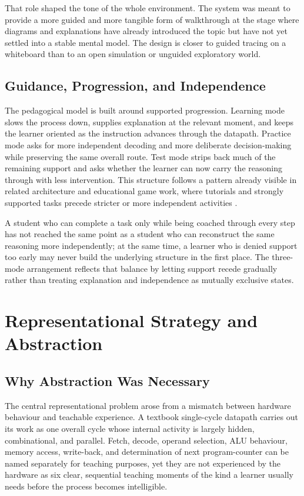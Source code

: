 That role shaped the tone of the whole environment. The system was meant to provide a more guided and more tangible form of walkthrough at the stage where diagrams and explanations have already introduced the topic but have not yet settled into a stable mental model. The design is closer to guided tracing on a whiteboard than to an open simulation or unguided exploratory world.

\subsection{Guidance, Progression, and Independence}

The pedagogical model is built around supported progression. Learning mode slows the process down, supplies explanation at the relevant moment, and keeps the learner oriented as the instruction advances through the datapath. Practice mode asks for more independent decoding and more deliberate decision-making while preserving the same overall route. Test mode strips back much of the remaining support and asks whether the learner can now carry the reasoning through with less intervention. This structure follows a pattern already visible in related architecture and educational game work, where tutorials and strongly supported tasks precede stricter or more independent activities \cite{tlili2016improving,tan2023vr}.

A student who can complete a task only while being coached through every step has not reached the same point as a student who can reconstruct the same reasoning more independently; at the same time, a learner who is denied support too early may never build the underlying structure in the first place. The three-mode arrangement reflects that balance by letting support recede gradually rather than treating explanation and independence as mutually exclusive states.

\section{Representational Strategy and Abstraction}

\subsection{Why Abstraction Was Necessary}

The central representational problem arose from a mismatch between hardware behaviour and teachable experience. A textbook single-cycle datapath carries out its work as one overall cycle whose internal activity is largely hidden, combinational, and parallel. Fetch, decode, operand selection, ALU behaviour, memory access, write-back, and determination of next program-counter can be named separately for teaching purposes, yet they are not experienced by the hardware as six clear, sequential teaching moments of the kind a learner usually needs before the process becomes intelligible.

